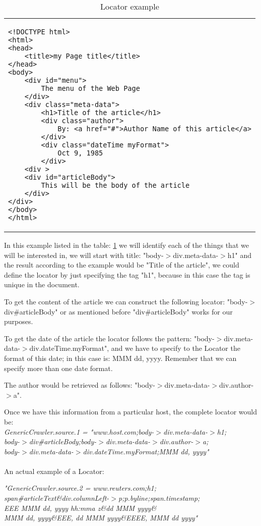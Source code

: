 \begin{table}\centering
	\caption{Locator example}\label{tab:locatorExample1}
   	\begin{tabular}{p{11.5cm}}
\lstset{language=HTML}
\begin{lstlisting}
<!DOCTYPE html>
<html>
<head>
    <title>my Page title</title>
</head>
<body>
	<div id="menu">
		The menu of the Web Page
	</div>
	<div class="meta-data">
		<h1>Title of the article</h1>
		<div class="author">
			By: <a href="#">Author Name of this article</a>
		</div>
		<div class="dateTime myFormat">
			Oct 9, 1985
		</div>
	<div >
	<div id="articleBody">
		This will be the body of the article
	</div>
</div> 
</body>
</html>
\end{lstlisting}
    \end{tabular}
\end{table}

In this example listed in the table: \ref{tab:locatorExample1} we will identify each of the things that we will be interested in, we will start with title: "body-$>$div.meta-data-$>$h1" and the result according to the example would be "Title of the article", we could define the locator by just specifying the tag "h1", because in this case the tag is unique in the document.

To get the content of the article we can construct the following locator: "body-$>$div\#articleBody" or as mentioned before "div\#articleBody" works for our purposes.

To get the date of the article the locator follows the pattern: "body-$>$div.meta-data-$>$div.dateTime.myFormat", and we have to specify to the Locator the format of this date; in this case is: MMM dd, yyyy. Remember that we can specify more than one date format.

The author would be retrieved as follows: "body-$>$div.meta-data-$>$div.author-$>$a".

Once we have this information from a particular host, the complete locator would be:\\
\emph{
GenericCrawler.source.1 = "www.host.com;body-$>$div.meta-data-$>$h1;\\
body-$>$div\#articleBody;body-$>$div.meta-data-$>$div.author-$>$a;\\
body-$>$div.meta-data-$>$div.dateTime.myFormat;MMM dd, yyyy"
}
\\\\
An actual example of a Locator:

\emph{
"GenericCrawler.source.2 = www.reuters.com;h1;\\
span\#articleText\&div.columnLeft-$>$p;p.byline;span.timestamp;\\
EEE MMM dd, yyyy hh:mma z\&dd MMM yyyy\&\\
MMM dd, yyyy\&EEE, dd MMM yyyy\&EEEE, MMM dd yyyy"}

